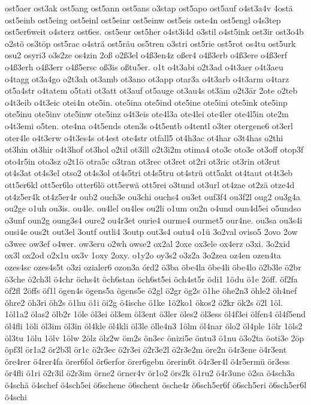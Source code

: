 {ost5aer
ost3ak
ost5ang
ost5ann
ost5ans
o3stap
ost5apo
ost5auf
o4st3a4v
4ostä
ost5einb
ost5eing
ost5einl
ost5einr
ost5einw
ost5eis
oste4n
ost5engl
o4s3tep
ost5er6weit
o4sterz
ost6es.
ost5eur
ost5her
o4st3i4d
o3stil
o4st5ink
ost3ir
ost3o4b
o2stö
os3töp
ost5rac
o4strä
ost5räu
os5tren
o3stri
ost5rie
ost5rot
os4tu
ost5urk
osu2
osyri3
o3s2ze
os4zin
2oß
o2ß3el
o4ß3en4z
oßer4
o4ß3erb
o4ß3ere
o4ß3erf
o4ß3erh
o4ß3err
o4ß5ersc
oß3is
oßtu5er.
o1t
o4t3abi
o2t3ad
o4t3aer
o4t3aeu
o4tagg
ot3a4go
o2t3ah
ot3amb
ot3ano
ot3app
otar3a
o4t3arb
o4t3arm
o4tarz
ot5a4str
o4tatem
o5tati
ot3att
ot3auf
ot5auge
ot3au4s
ot3äm
o2t3är
2ote
o2teb
o4t3eib
o4t3eic
otei4n
ote5in.
ote5ina
ote5ind
ote5ine
ote5ini
ote5ink
ote5inp
ote5inu
ote5inv
ote5inw
ote5inz
o4t3eis
ote4l3a
ote4lei
ote4ler
ote4l5in
ote2m
o4t3emi
o5ten.
ote4na
o4t5ends
oten3s
o4t5entb
o4tentl
o3ter
otergene6
ot3erl
oter4le
o4t3erw
o4t3es4s
ot4est
ote4str
otfall5
ot4h3ac
ot4har
o3t4has
o2thi
ot3hin
ot3hir
o4t3hof
ot3hol
o2til
ot3ill
o2t3i2m
otima4
oto3c
oto3e
ot3off
otop3f
oto4r5in
oto3sz
o2t1ö
otra5c
o3tran
ot3rec
ot3ret
ot2ri
ot3ric
ot3rin
ot3rut
ot4s3at
ot4s3el
otso2
ot4s3ol
ot4s5tri
ot4s5tru
ot4strü
ott5akt
ot4taut
ot4t3eb
ott5er6kl
ott5er6lo
otter6lö
ott5erwä
ott5rei
o3tund
ot3url
ot4zae
ot2zä
otze4d
ot4z5er4k
ot4z5er4r
oub2
ouch3e
ou3chi
ouchs4
ou3et
ouf3f4
ou3f2l
oug2
ou3g4a
ou2ge
o1uh
ou3is.
ou4le.
ou4lel
ou4les
ou2li
o1um
ou2n
o4und
oun4d5ei
o5undso
o3unf
oun2g
oung3s4
oure2
ou4r3et
ourie4
ourme4
ourmet5
our4ne.
ou3sa
ou3s4i
ousi4e
ous2t
out3el
3outf
outli4
3outp
out3s4
outu4
o1ü
3o2val
oviso5
2ovo
2ow
o3wec
ow3ef
o4wer.
ow3eru
o2wh
owse2
ox2al
2oxe
ox3ele
ox4erz
o3xi.
3o2xid
ox3l
ox2od
o2x1u
ox3v
1oxy
2oxy.
o1y2o
oy3s2
o3z2a
3o2zea
oz4en
ozen4ta
ozes4sc
ozes4s5t
o3zi
ozialer6
ozon3a
órd2
ö3ba
öbe4la
öbe4li
öbe4lo
ö2b3le
ö2br
ö3che
ö2ch3l
ö4chr
öchs4t
öch6stan
öch6st5ei
öch4st5r
ödi1
1ödu
ö1e
2öff.
öf2fa
öf2fl
2öffs
öf1l
ögen4s
ögens5a
ögens5e
ö2gl
ö2gr
ög2s
ö1he
öhe2n3
öhle2
öh4nef
öhre2
öh3ri
öh2s
ö1hu
ö1i
öi2g
ö4ische
ö1ke
1ö2ko1
ökos2
ö2kr
ök2s
ö2l
1öl.
1öl1a2
ölas2
ölb2r
1öle
öl3ei
öl3em
öl3ent
ö3ler
öles2
öl3ess
öl4f3ei
ölfen4
öl4f5end
öl4fli
1öli
öl3im
öl3in
öl4kle
öl4kli
öl3le
ölle4n3
1ölm
öl4nar
ölo2
öl4ple
1ölr
1öls2
öl3tu
1ölu
1ölv
1ölw
2ölz
ölz2w
öm2s
ön3ec
önizi5e
öntu3
ö1nu
ö3o2ta
öoti3e
2öp
öpf3l
ör1a2
ör2b3l
ör1c
ö2r3ec
ö2r3ei
ö2r3e2l
ö2r3e2m
öre2n
ö4r3ene
ö4r3ent
öre4rer
ö4rer4fa
örer6fol
ör6erfor
örer6gebn
örerin6t
ö4r3er4l
ö4r5ermü
ör3ess
ör4fli
ö1ri
ö2r3il
ö2r3im
örne2
örner4v
ör1o2
örs2k
ö1ru2
ö4r3une
ö2sa
ö4sch3a
ö4schä
ö4schef
ö4sch5ei
ö6schene
ö6schent
ösche4r
ö6sch5er6f
ö6sch5eri
ö6sch5er6l
ö4schi
}
